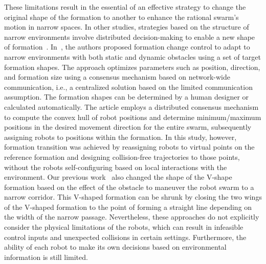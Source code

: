 These limitations result in the essential of an effective strategy to change the original shape of the formation to another to enhance the rational swarm's motion in narrow spaces. In other studies, strategies based on the structure of narrow environments involve distributed decision-making to enable a new shape of formation~\cite{9565893,AlonsoMora2018}. In~\cite{AlonsoMora2018}, the authors proposed formation change control to adapt to narrow environments with both static and dynamic obstacles using a set of target formation shapes. The approach optimizes parameters such as position, direction, and formation size using a consensus mechanism based on network-wide communication, i.e., a centralized solution based on the limited communication assumption. The formation shapes can be determined by a human designer or calculated automatically. The article employs a distributed consensus mechanism to compute the convex hull of robot positions and determine minimum/maximum positions in the desired movement direction for the entire swarm, subsequently assigning robots to positions within the formation. In this study, however, formation transition was achieved by reassigning robots to virtual points on the reference formation and designing collision-free trajectories to those points, without the robots self-configuring based on local interactions with the environment. Our previous work~\cite{10417519} also changed the shape of the V-shape formation based on the effect of the obstacle to maneuver the robot swarm to a narrow corridor. This V-shaped formation can be shrunk by closing the two wings of the V-shaped formation to the point of forming a straight line depending on the width of the narrow passage. Nevertheless, these approaches do not explicitly consider the physical limitations of the robots, which can result in infeasible control inputs and unexpected collisions in certain settings. Furthermore, the ability of each robot to make its own decisions based on environmental information is still limited.

